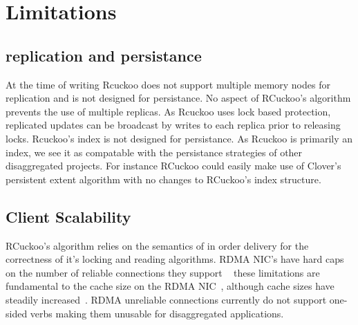 \section{Limitations}
\label{sec:limations}

\subsection{replication and persistance}
At the time of writing Rcuckoo does not support multiple
memory nodes for replication and is not designed for
persistance. No aspect of RCuckoo's algorithm prevents the
use of multiple replicas. As Rcuckoo uses lock based
protection, replicated updates can be broadcast by writes to
each replica prior to releasing locks. Rcuckoo's index is
not designed for persistance. As Rcuckoo is primarily an
index, we see it as compatable with the persistance
strategies of other disaggregated projects. For instance
RCuckoo could easily make use of Clover's persistent extent
algorithm with no changes to RCuckoo's index structure.

\subsection{Client Scalability} RCuckoo's algorithm relies
on the semantics of in order delivery for the correctness of
it's locking and reading algorithms. RDMA NIC's have hard
caps on the number of reliable connections they support
~ these limitations are fundamental to the
cache size on the RDMA NIC~\cite{erpc,faast}, although cache
sizes have steadily increased~\cite{storm}. RDMA unreliable
connections currently do not support one-sided verbs making
them unusable for disaggregated applications.
